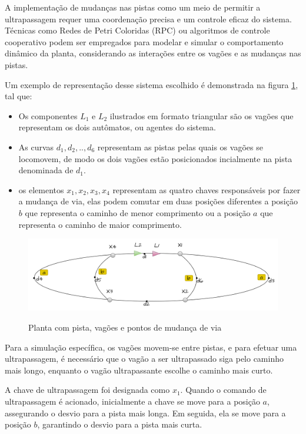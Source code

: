 A implementação de mudanças nas pistas como um meio de permitir a ultrapassagem requer uma coordenação precisa e um controle eficaz do sistema. Técnicas como Redes de Petri Coloridas (RPC) ou algoritmos de controle cooperativo podem ser empregados para modelar e simular o comportamento dinâmico da planta, considerando as interações entre os vagões e as mudanças nas pistas.

Um exemplo de representação desse sistema escolhido é demonstrada na figura \ref{fig:pista_com_dois_agentes}, tal que:
\begin{itemize}
    \item Os componentes $L_1$ e $L_2$ ilustrados em formato triangular são os vagões que representam os dois autômatos, ou agentes do sistema.
    \item As curvas $d_1,d_2,..,d_6$ representam as pistas pelas quais os vagões se locomovem, de modo os dois vagões estão posicionados incialmente na pista denominada de $d_1$.
    \item os elementos $x_1,x_2,x_3,x_4$ representam as quatro chaves responsáveis por fazer a mudança de via, elas podem comutar em duas posições diferentes a posição $b$ que representa o caminho de menor comprimento ou a posição $a$ que representa o caminho de maior comprimento.
\end{itemize}

\begin{figure}[h]
\centering
\caption{Planta com pista, vagões e pontos de mudança de via }
\includegraphics[width=1\linewidth]{figures/Simulation/Planta/planta_dois_agentes.png}
\label{fig:pista_com_dois_agentes}
\end{figure}

Para a simulação específica, os vagões movem-se entre pistas, e para efetuar uma ultrapassagem, é necessário que o vagão a ser ultrapassado siga pelo caminho mais longo, enquanto o vagão ultrapassante escolhe o caminho mais curto.

A chave de ultrapassagem foi designada como $x_1$. Quando o comando de ultrapassagem é acionado, inicialmente a chave se move para a posição $a$, assegurando o desvio para a pista mais longa. Em seguida, ela se move para a posição $b$, garantindo o desvio para a pista mais curta.

